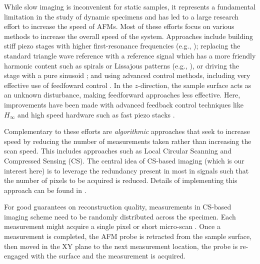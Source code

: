 \documentclass[journal,twocolumn,twoside]{IEEEtran}
\begin{document}
While slow imaging is inconvenient for static samples, it represents a fundamental limitation in the study of dynamic specimens and  has led to a large research effort to increase the speed of AFMs. Most of these efforts focus on various methods to increase the overall speed of the system. Approaches include building stiff piezo stages with higher first-resonance frequencies (e.g., \cite{schitter_designmodeling,kenton_threeaxis}); replacing the standard triangle wave reference with a reference signal which has a more friendly harmonic content such as spirals or Lissajous patterns (e.g., \cite{Mahmood_nano_2009,Tuma:2012hv,rana_spiral_2014}), or driving the stage with a pure sinusoid \cite{fleming_bridging_2010}; and using advanced control methods, including very effective use of feedfoward control \cite{butterworth_dualadaptive_2011, li_feedforward_2007,moheimani_IRC, Leang_IEEECS_2009}. In the $z$-direction, the sample surface acts as an unknown disturbance, making feedforward approaches less effective. Here, improvements have been made with advanced feedback control techniques like $H_{\infty}$ and high speed hardware such as fast piezo stacks \cite{fleming_bridging_2010, reza_zaxis_videorate}.




Complementary to these efforts are \emph{algorithmic} approaches that seek to increase speed by reducing the number of measurements taken rather than increasing the scan speed. This includes approaches such as Local Circular Scanning \cite{Huang:2014dw,Hartman:2017ud} and Compressed Sensing (CS). The central idea of CS-based imaging (which is our interest here) is to leverage the redundancy present in most in signals such that the  number of pixels to be acquired is reduced. Details of implementing this approach can be found in \cite{braker_hardware_2018}.

For good guarantees on reconstruction quality, measurements in CS-based imaging scheme need to be randomly distributed across the specimen. Each measurement might acquire a single pixel \cite{andersson_pao} or short micro-scan \cite{braker_hardware_2018, maxwell_acc_2014}. Once a measurement is completed, the AFM probe is retracted from the sample surface, then moved in the XY plane to the next measurement location, the probe is re-engaged with the surface and the measurement is acquired. 
\end{document}
